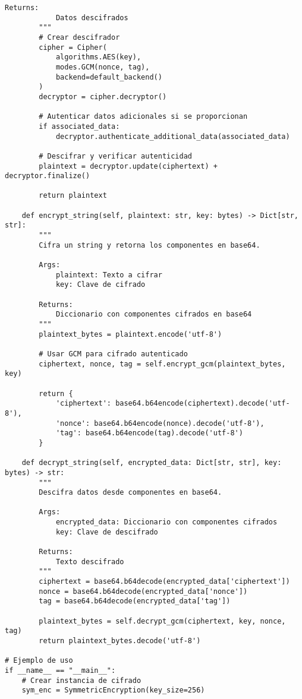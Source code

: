\documentclass[12pt,a4paper]{article}
\begin{document}
\begin{lstlisting}[caption=Implementación de cifrado simétrico con AES]
        Returns:
            Datos descifrados
        """
        # Crear descifrador
        cipher = Cipher(
            algorithms.AES(key),
            modes.GCM(nonce, tag),
            backend=default_backend()
        )
        decryptor = cipher.decryptor()
        
        # Autenticar datos adicionales si se proporcionan
        if associated_data:
            decryptor.authenticate_additional_data(associated_data)
        
        # Descifrar y verificar autenticidad
        plaintext = decryptor.update(ciphertext) + decryptor.finalize()
        
        return plaintext
    
    def encrypt_string(self, plaintext: str, key: bytes) -> Dict[str, str]:
        """
        Cifra un string y retorna los componentes en base64.
        
        Args:
            plaintext: Texto a cifrar
            key: Clave de cifrado
            
        Returns:
            Diccionario con componentes cifrados en base64
        """
        plaintext_bytes = plaintext.encode('utf-8')
        
        # Usar GCM para cifrado autenticado
        ciphertext, nonce, tag = self.encrypt_gcm(plaintext_bytes, key)
        
        return {
            'ciphertext': base64.b64encode(ciphertext).decode('utf-8'),
            'nonce': base64.b64encode(nonce).decode('utf-8'),
            'tag': base64.b64encode(tag).decode('utf-8')
        }
    
    def decrypt_string(self, encrypted_data: Dict[str, str], key: bytes) -> str:
        """
        Descifra datos desde componentes en base64.
        
        Args:
            encrypted_data: Diccionario con componentes cifrados
            key: Clave de descifrado
            
        Returns:
            Texto descifrado
        """
        ciphertext = base64.b64decode(encrypted_data['ciphertext'])
        nonce = base64.b64decode(encrypted_data['nonce'])
        tag = base64.b64decode(encrypted_data['tag'])
        
        plaintext_bytes = self.decrypt_gcm(ciphertext, key, nonce, tag)
        return plaintext_bytes.decode('utf-8')

# Ejemplo de uso
if __name__ == "__main__":
    # Crear instancia de cifrado
    sym_enc = SymmetricEncryption(key_size=256)
    

\end{lstlisting}
\end{document}
